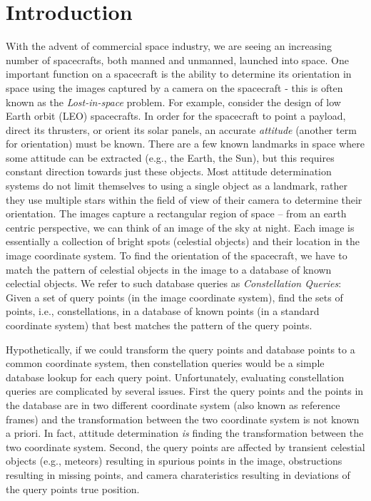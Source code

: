 \section{Introduction}\label{sec:introduction}
With the advent of commercial space industry, we are seeing
an increasing number of spacecrafts, both manned and unmanned,
launched into space. One important function on a spacecraft
is the ability to determine its orientation in space using
the images captured by a camera on the spacecraft - this is
often known as the \textit{Lost-in-space} problem.
For example, consider the design of low Earth
orbit (LEO) spacecrafts. In order for the spacecraft to
point a payload, direct its thrusters, or orient its solar
panels, an accurate \textit{attitude} (another term for
orientation) must be known. There are a few known landmarks
in space where some attitude can be extracted (e.g., the
Earth, the Sun), but this requires constant direction
towards just these objects. Most attitude determination
systems do not limit themselves to using a single object as
a landmark, rather they use multiple stars within the
field of view of their camera to determine their orientation.
The images capture a rectangular region of space -- from an
earth centric perspective, we can think of an image of the
sky at night. Each image is essentially a collection of
bright spots (celestial objects) and their location in the
image coordinate system. To find the orientation of the
spacecraft, we have to match the pattern of celestial
objects in the image to a database of known celectial
objects. We refer to such database queries as 
\textit{Constellation Queries}: Given a set of query points (in
the image coordinate system), find the sets of points, i.e.,
constellations, in a database of known points (in a standard
coordinate system) that best matches the pattern of the
query points. 

Hypothetically, if we could transform the
query points and database points to a common coordinate
system, then constellation queries would be a simple
database lookup for each query point. Unfortunately,
evaluating constellation queries are complicated by several
issues. First the query points and the points in the
database are in two different coordinate system (also known
as reference frames) and the transformation between the two
coordinate system is not known a priori. In fact, attitude
determination \emph{is} finding the transformation between
the two coordinate system. Second, the query
points are affected by transient celestial objects (e.g.,
meteors) resulting in spurious points in the image,
obstructions resulting in missing points, and camera
charateristics resulting in deviations of the query points
true position.

